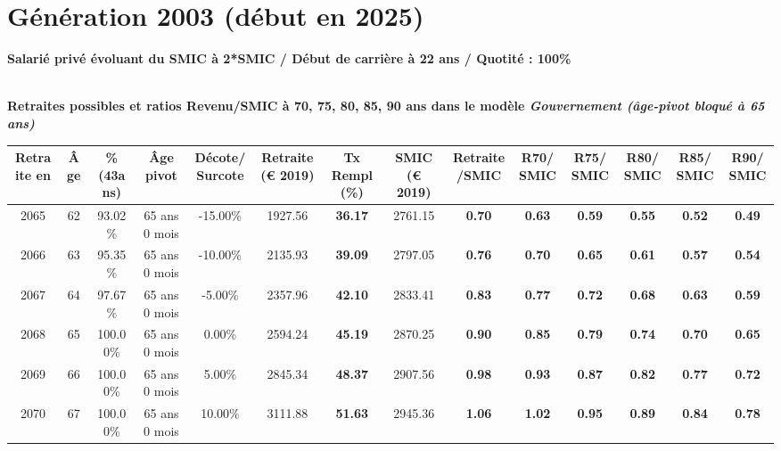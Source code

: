 \newpage 
 
\section{Génération 2003 (début en 2025)\label{Ascendant12_100_2003_22_0}} 
 
{\bf \noindent Salarié privé évoluant du SMIC à 2*SMIC / Début de carrière à 22 ans / Quotité : 100\%}  ~ 

 ~\\{\bf \noindent Retraites possibles et ratios Revenu/SMIC à 70, 75, 80, 85, 90 ans dans le modèle \emph{Gouvernement (âge-pivot bloqué à 65 ans)}}  
 
\begin{adjustbox}{max width=\textwidth} 
\begin{tabular}[htb]{|c|c||c|c|c||c|c||c|c||c|c|c|c|c|} 
\hline 
 Retraite en &  Âge &  \%(43ans) &  Âge pivot &  Décote/Surcote &  Retraite (\euro{} 2019) &  Tx Rempl(\%) &  SMIC (\euro{} 2019) &  Retraite/SMIC &  R70/SMIC &  R75/SMIC &  R80/SMIC &  R85/SMIC &  R90/SMIC \\ 
\hline \hline 
 2065 &  62 &  93.02\% &  65 ans 0 mois &  -15.00\% &  1927.56 &  {\bf 36.17} &  2761.15 &  {\bf {\color{red} 0.70}} &  {\bf {\color{red} 0.63}} &  {\bf {\color{red} 0.59}} &  {\bf {\color{red} 0.55}} &  {\bf {\color{red} 0.52}} &  {\bf {\color{red} 0.49}} \\ 
\hline 
 2066 &  63 &  95.35\% &  65 ans 0 mois &  -10.00\% &  2135.93 &  {\bf 39.09} &  2797.05 &  {\bf {\color{red} 0.76}} &  {\bf {\color{red} 0.70}} &  {\bf {\color{red} 0.65}} &  {\bf {\color{red} 0.61}} &  {\bf {\color{red} 0.57}} &  {\bf {\color{red} 0.54}} \\ 
\hline 
 2067 &  64 &  97.67\% &  65 ans 0 mois &  -5.00\% &  2357.96 &  {\bf 42.10} &  2833.41 &  {\bf {\color{red} 0.83}} &  {\bf {\color{red} 0.77}} &  {\bf {\color{red} 0.72}} &  {\bf {\color{red} 0.68}} &  {\bf {\color{red} 0.63}} &  {\bf {\color{red} 0.59}} \\ 
\hline 
 2068 &  65 &  100.00\% &  65 ans 0 mois &  0.00\% &  2594.24 &  {\bf 45.19} &  2870.25 &  {\bf {\color{red} 0.90}} &  {\bf {\color{red} 0.85}} &  {\bf {\color{red} 0.79}} &  {\bf {\color{red} 0.74}} &  {\bf {\color{red} 0.70}} &  {\bf {\color{red} 0.65}} \\ 
\hline 
 2069 &  66 &  100.00\% &  65 ans 0 mois &  5.00\% &  2845.34 &  {\bf 48.37} &  2907.56 &  {\bf {\color{red} 0.98}} &  {\bf {\color{red} 0.93}} &  {\bf {\color{red} 0.87}} &  {\bf {\color{red} 0.82}} &  {\bf {\color{red} 0.77}} &  {\bf {\color{red} 0.72}} \\ 
\hline 
 2070 &  67 &  100.00\% &  65 ans 0 mois &  10.00\% &  3111.88 &  {\bf 51.63} &  2945.36 &  {\bf 1.06} &  {\bf 1.02} &  {\bf {\color{red} 0.95}} &  {\bf {\color{red} 0.89}} &  {\bf {\color{red} 0.84}} &  {\bf {\color{red} 0.78}} \\ 
\hline 
\hline 
\end{tabular} 
\end{adjustbox} 
 
